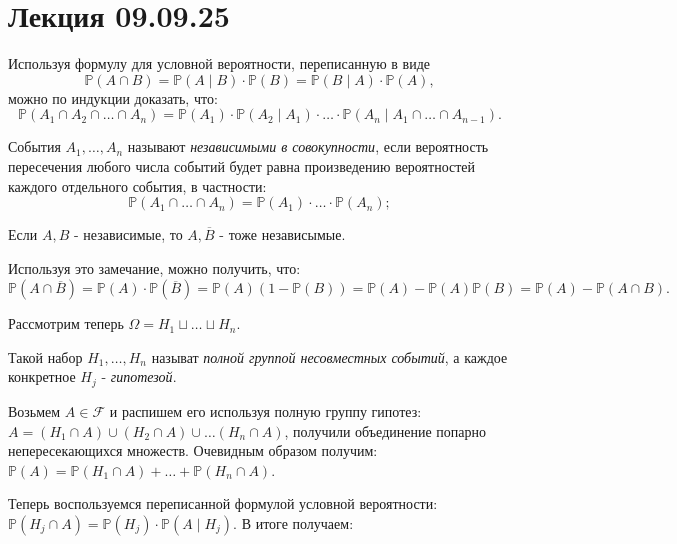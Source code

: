 \documentclass[12pt,a4paper]{article}
\begin{document}
\section{Лекция 09.09.25}

Используя формулу для условной вероятности, переписанную в виде \[ \mathbb{P} \left( A \cap B\right) = \mathbb{P} \left( A \mid B\right) \cdot \mathbb{P} \left( B\right) = \mathbb{P} \left( B \mid A\right) \cdot \mathbb{P} \left( A\right),\]
можно по индукции доказать, что: \[ \mathbb{P} \left( A_1 \cap A_2 \cap \dots \cap A_n \right) = \mathbb{P} \left( A_1 \right) \cdot \mathbb{P} \left( A_2 \mid A_1 \right) \cdot \ldots \cdot \mathbb{P}\left(A_n \mid A_1 \cap \dots \cap A_{n-1}\right).\]

\begin{definition}
    События \(A_1, \ldots, A_n \) называют \textit{независимыми в совокупности}, если вероятность пересечения любого числа событий будет равна произведению вероятностей каждого отдельного события, в частности: \[ \mathbb{P} \left(A_1 \cap \dots \cap A_n\right) = \mathbb{P} \left( A_1\right) \cdot \ldots \cdot \mathbb{P} \left( A_n\right);\]
\end{definition}

\begin{remark}
    Если \(A, B\) - независимые, то \(A, \overline{B}\) - тоже независымые.
\end{remark}

Используя это замечание, можно получить, что: \( \mathbb{P}( A \cap \overline{B}) = \mathbb{P} ( A) \cdot \mathbb{P} ( \overline{B})= \mathbb{P}( A) ( 1 - \mathbb{P}( B)) = \mathbb{P}( A) - \mathbb{P}( A) \mathbb{P}( B) = \mathbb{P}(A) - \mathbb{P}( A \cap B).\)

Рассмотрим теперь \(\Omega = H_1 \sqcup \dots \sqcup H_n\). 

\begin{definition}
    Такой набор \(H_1, \ldots, H_n\) называт \textit{полной группой несовместных событий}, а каждое конкретное \(H_j\) - \textit{гипотезой}. 
\end{definition}

Возьмем \(A \in \mathcal{F}\) и распишем его используя полную группу гипотез: \( A = (H_1 \cap A) \cup (H_2 \cap A) \cup \dots (H_n \cap A)\), получили объединение попарно непересекающихся множеств.
Очевидным образом получим: \(\mathbb{P} (A) = \mathbb{P}(H_1 \cap A) + \ldots + \mathbb{P} (H_n \cap A).\)

Теперь воспользуемся переписанной формулой условной вероятности: \(\mathbb{P}(H_j \cap A) = \mathbb{P} (H_j) \cdot \mathbb{P}(A \mid H_j).\)
В итоге получаем:
\end{document}
